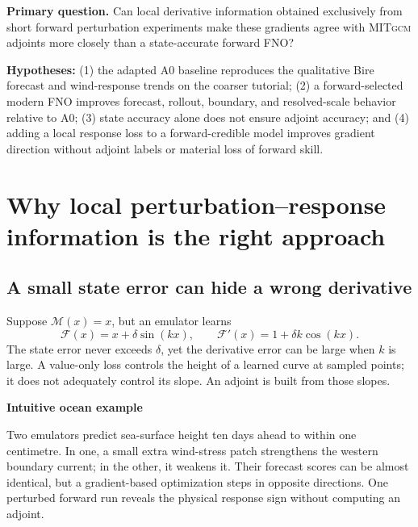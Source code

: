 \documentclass[11pt]{article}
\newcommand{\MITgcm}{\textsc{MITgcm}}
\newenvironment{examplebox}[1]
  {\begin{center}\begin{lrbox}{\examplestore}\begin{minipage}{0.92\textwidth}%
   \textbf{#1}\par\smallskip}
  {\end{minipage}\end{lrbox}\setlength{\fboxsep}{8pt}%
   \fcolorbox{blue}{lightblue}{\usebox{\examplestore}}\end{center}}
\begin{document}
\textbf{Primary question.} Can local derivative information obtained exclusively from
short forward perturbation experiments make these gradients agree with \MITgcm{}
adjoints more closely than a state-accurate forward FNO?

\textbf{Hypotheses:} (1) the adapted A0 baseline reproduces the qualitative Bire forecast
and wind-response trends on the coarser tutorial; (2) a forward-selected modern FNO
improves forecast, rollout, boundary, and resolved-scale behavior relative to A0;
(3) state accuracy alone does not ensure adjoint accuracy; and (4) adding a local
response loss to a forward-credible model improves gradient direction without adjoint
labels or material loss of forward skill.

\section{Why local perturbation--response information is the right approach}
\subsection{A small state error can hide a wrong derivative}
Suppose \(\mathcal{M}(x)=x\), but an emulator learns
\[
\mathcal{F}(x)=x+\delta\sin(kx),\qquad
\mathcal{F}'(x)=1+\delta k\cos(kx).
\]
The state error never exceeds \(\delta\), yet the derivative error can be large when
\(k\) is large. A value-only loss controls the height of a learned curve at sampled
points; it does not adequately control its slope. An adjoint is built from those slopes.

\begin{examplebox}{Intuitive ocean example}
Two emulators predict sea-surface height ten days ahead to within one centimetre. In one,
a small extra wind-stress patch strengthens the western boundary current; in the other,
it weakens it. Their forecast scores can be almost identical, but a gradient-based
optimization steps in opposite directions. One perturbed forward run reveals the
physical response sign without computing an adjoint.
\end{examplebox}
\end{document}
